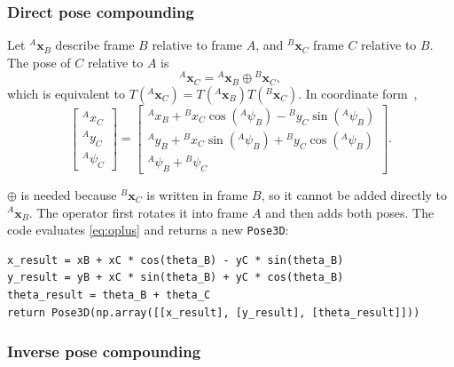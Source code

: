 \documentclass[letterpaper,12pt]{article}
\newcommand{\opluspose}{\mathbin{\oplus}}
\begin{document}
\subsubsection{Direct pose compounding}

Let ${}^{A}\boldsymbol{x}_{B}$ describe frame $B$ relative to frame $A$, and
${}^{B}\boldsymbol{x}_{C}$ frame $C$ relative to $B$. The pose of $C$
relative to $A$ is
\begin{equation}
    {}^{A}\boldsymbol{x}_{C}
    ={}^{A}\boldsymbol{x}_{B}\opluspose{}^{B}\boldsymbol{x}_{C},
\end{equation}
which is equivalent to
$T({}^{A}\boldsymbol{x}_{C})=T({}^{A}\boldsymbol{x}_{B})
T({}^{B}\boldsymbol{x}_{C})$. In coordinate form~\cite[p.~24]{slidesIntro},
\begin{equation}
\begin{bmatrix}
{}^{A}x_C\\{}^{A}y_C\\{}^{A}\psi_C
\end{bmatrix}
=
\begin{bmatrix}
{}^{A}x_B+{}^{B}x_C\cos({}^{A}\psi_B)-{}^{B}y_C\sin({}^{A}\psi_B)\\
{}^{A}y_B+{}^{B}x_C\sin({}^{A}\psi_B)+{}^{B}y_C\cos({}^{A}\psi_B)\\
{}^{A}\psi_B+{}^{B}\psi_C
\end{bmatrix}.
\label{eq:oplus}
\end{equation}

$\oplus$ is needed because ${}^{B}\boldsymbol{x}_{C}$ is written in frame $B$,
so it cannot be added directly to ${}^{A}\boldsymbol{x}_{B}$. The operator first
rotates it into frame $A$ and then adds both poses. The code evaluates
\cref{eq:oplus} and returns a new \texttt{Pose3D}:
\begin{lstlisting}[caption={Core of the direct compounding implementation.}]
x_result = xB + xC * cos(theta_B) - yC * sin(theta_B)
y_result = yB + xC * sin(theta_B) + yC * cos(theta_B)
theta_result = theta_B + theta_C
return Pose3D(np.array([[x_result], [y_result], [theta_result]]))
\end{lstlisting}

\subsubsection{Inverse pose compounding}
\end{document}
